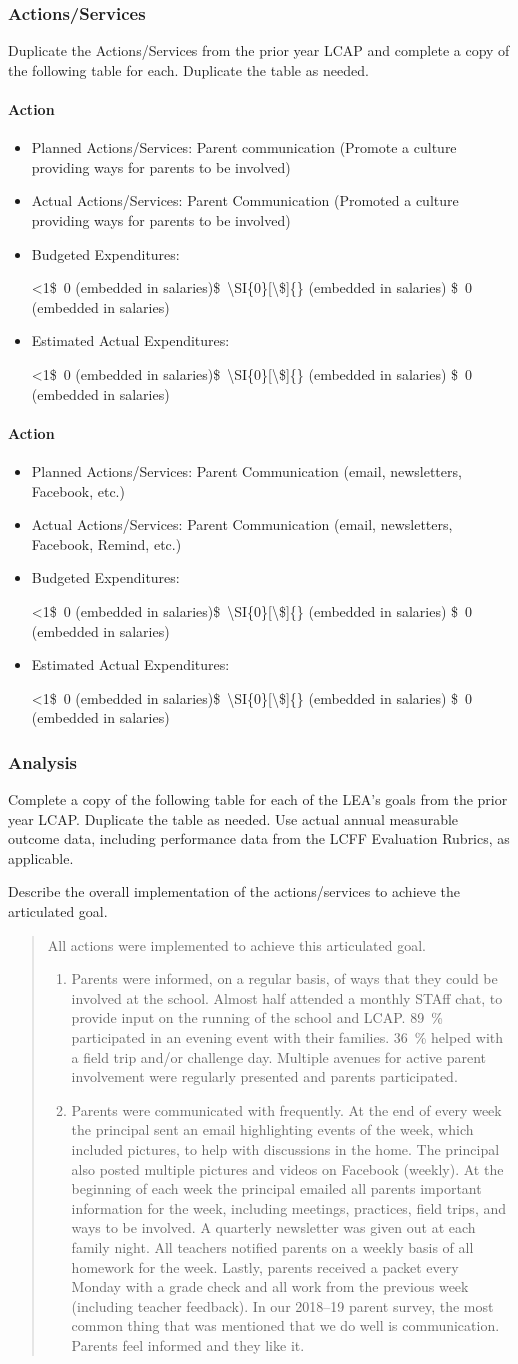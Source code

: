 \documentclass{article}
\newcommand{\dollar}[1]{\SI{#1}[\$]{}}
\newcommand{\trydollar}[1]{
	\ifnum9<1#1\relax\dollar{#1}
	\else
		#1
	\fi
}
\newcounter{goal}[section] %
\newcounter{action}[goal]
\newcommand{\actionupdate}[4]{
	\stepcounter{action}
	\paragraph{Action \theaction}
	\begin{itemize}[label={}]
		\item Planned Actions/Services: #1
		\item Actual Actions/Services: #2
		\item Budgeted Expenditures: 
			\trydollar{#3}
		\item Estimated Actual Expenditures: 
			\trydollar{#4}
	\end{itemize}
}
\newenvironment{actionanalysis}
	{
		\begin{enumerate}[label={\bf Action \theenumi:}]
	}
	{
		\end{enumerate}
	}
\begin{document}
\subsubsection{Actions/Services}
Duplicate the Actions/Services from the prior year LCAP and complete a copy of the following table for each. Duplicate the table as needed.
\actionupdate
	{Parent communication (Promote a culture providing ways for parents to be involved)}
	{Parent Communication (Promoted a culture providing ways for parents to be involved)}
	{\dollar{0} (embedded in salaries)}
	{\dollar{0} (embedded in salaries)}

\actionupdate
	{Parent Communication (email, newsletters, Facebook, etc.)}
	{Parent Communication (email, newsletters, Facebook, Remind, etc.)}
	{\dollar{0} (embedded in salaries)}
	{\dollar{0} (embedded in salaries)}

\subsubsection{Analysis}
Complete a copy of the following table for each of the LEA's goals from the prior year LCAP. Duplicate the table as needed. Use actual annual measurable outcome data, including performance data from the LCFF Evaluation Rubrics, as applicable.

Describe the overall implementation of the actions/services to achieve the articulated goal.
\begin{quotation}
	All actions were implemented to achieve this articulated goal.
	\begin{actionanalysis}
	\item Parents were informed, on a regular basis, of ways that they could be involved at the school. Almost half attended a monthly STAff chat, to provide input on the running of the school and LCAP. \SI{89}{\percent} participated in an evening event with their families. \SI{36}{\percent} helped with a field trip and/or challenge day. Multiple avenues for active parent involvement were regularly presented and parents participated.
	\item Parents were communicated with frequently. At the end of every week the principal sent an email highlighting events of the week, which included pictures, to help with discussions in the home. The principal also posted multiple pictures and videos on Facebook (weekly). At the beginning of each week the principal emailed all parents important information for the week, including meetings, practices, field trips, and ways to be involved. A quarterly newsletter was given out at each family night. All teachers notified parents on a weekly basis of all homework for the week. Lastly, parents received a packet every Monday with a grade check and all work from the previous week (including teacher feedback). In our 2018--19 parent survey, the most common thing that was mentioned that we do well is communication. Parents feel informed and they like it.
	\end{actionanalysis}
\end{quotation}
\end{document}
